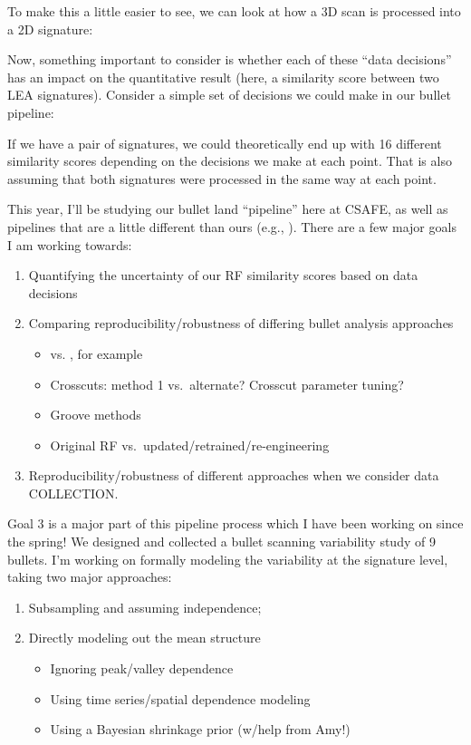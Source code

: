 \documentclass[]{book}
\providecommand{\tightlist}{%
  \setlength{\itemsep}{0pt}\setlength{\parskip}{0pt}}
\begin{document}
To make this a little easier to see, we can look at how a 3D scan is processed into a 2D signature:

Now, something important to consider is whether each of these ``data decisions'' has an impact on the quantitative result (here, a similarity score between two LEA signatures). Consider a simple set of decisions we could make in our bullet pipeline:

If we have a pair of signatures, we could theoretically end up with 16 different similarity scores depending on the decisions we make at each point. That is also assuming that both signatures were processed in the same way at each point.

This year, I'll be studying our bullet land ``pipeline'' here at CSAFE, as well as pipelines that are a little different than ours (e.g., \citet{chu_jfs}). There are a few major goals I am working towards:

\begin{enumerate}
\def\labelenumi{\arabic{enumi}.}
\tightlist
\item
  Quantifying the uncertainty of our RF similarity scores based on data decisions\\
\item
  Comparing reproducibility/robustness of differing bullet analysis approaches

  \begin{itemize}
  \tightlist
  \item
    \citet{aoas} vs. \citet{chu_jfs}, for example
  \item
    Crosscuts: method 1 vs.~alternate? Crosscut parameter tuning?
  \item
    Groove methods\\
  \item
    Original RF vs.~updated/retrained/re-engineering
  \end{itemize}
\item
  Reproducibility/robustness of different approaches when we consider data COLLECTION.
\end{enumerate}

Goal 3 is a major part of this pipeline process which I have been working on since the spring! We designed and collected a bullet scanning variability study of 9 bullets. I'm working on formally modeling the variability at the signature level, taking two major approaches:

\begin{enumerate}
\def\labelenumi{\arabic{enumi}.}
\tightlist
\item
  Subsampling and assuming independence;
\item
  Directly modeling out the mean structure

  \begin{itemize}
  \tightlist
  \item
    Ignoring peak/valley dependence
  \item
    Using time series/spatial dependence modeling
  \item
    Using a Bayesian shrinkage prior (w/help from Amy!)
  \end{itemize}
\end{enumerate}
\end{document}
